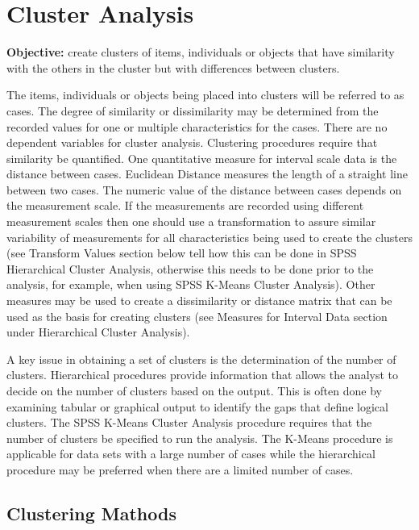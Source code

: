 \documentclass[a4paper,12pt]{article}
\begin{document}
\section{Cluster Analysis}
\noindent \textbf{Objective:} create clusters of items, individuals or objects that have similarity with the others in the cluster but with differences between clusters.  

The items, individuals or objects being placed into clusters will be referred to as cases.  The degree of similarity or dissimilarity may be determined from the recorded values for one or multiple characteristics for the cases.  There are no dependent variables for cluster analysis.  Clustering procedures require that similarity be quantified.  One quantitative measure for interval scale data is the distance between cases.  Euclidean Distance measures the length of a straight line between two cases.  The numeric value of the distance between cases depends on the measurement scale.  If the measurements are recorded using different measurement scales then one should use a transformation to assure similar variability of measurements for all characteristics being used to create the clusters (see Transform Values section below tell how this can be done in SPSS Hierarchical Cluster Analysis, otherwise this needs to be done prior to the analysis, for example, when using SPSS K-Means Cluster Analysis).  Other measures may be used to create a dissimilarity or distance matrix that can be used as the basis for creating clusters (see Measures for Interval Data section under Hierarchical Cluster Analysis).  

A key issue in obtaining a set of clusters is the determination of the number of clusters.  Hierarchical procedures provide information that allows the analyst to decide on the number of clusters based on the output.  This is often done by examining tabular or graphical output to identify the gaps that define logical clusters.  The SPSS K-Means Cluster Analysis procedure requires that the number of clusters be specified to run the analysis.  The K-Means procedure is applicable for data sets with a large number of cases while the hierarchical procedure may be preferred when there are a limited number of cases.

\subsection*{Clustering Mathods}
\end{document}
